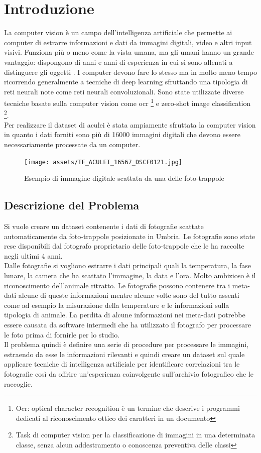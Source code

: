 \documentclass[12pt,a4paper,twoside]{article}
\begin{document}
\section{Introduzione}
La computer vision è un campo dell'intelligenza artificiale che permette ai computer di estrarre 
informazioni e dati da immagini digitali, video e altri input visivi. Funziona più o meno come la 
vista umana, ma gli umani hanno un grande vantaggio: dispongono di anni e anni di esperienza in cui 
si sono allenati a distinguere gli oggetti \cite{ibm-comp-vision}. I computer devono fare lo stesso 
ma in molto meno tempo ricorrendo generalmente a tecniche di deep learning sfruttando una tipologia di 
reti neurali note come reti neurali convoluzionali. Sono state utilizzate diverse tecniche basate sulla 
computer vision come ocr \footnote{Ocr: optical character recognition è un termine che descrive i 
programmi dedicati al riconoscimento ottico dei caratteri in un documento} e zero-shot image 
classification \footnote{Task di computer vision per la classificazione di immagini in una determinata 
classe, senza alcun addestramento o conoscenza preventiva delle classi}.\\ 
Per realizzare il dataset di aculei è stata ampiamente sfruttata la computer vision in quanto i dati 
forniti sono più di 16000 immagini digitali che devono essere necessariamente processate da un computer.

\begin{figure}[!ht]
    \centering
    \texttt{[image: assets/TF\_ACULEI\_16567\_DSCF0121.jpg]}
    \caption{Esempio di immagine digitale scattata da una delle foto-trappole}
    \label{fig:enter-label}
\end{figure}

\subsection{Descrizione del Problema}
Si vuole creare un dataset contenente i dati di fotografie scattate automaticamente da foto-trappole 
posizionate in Umbria. Le fotografie sono state rese disponibili dal fotografo proprietario delle 
foto-trappole che le ha raccolte negli ultimi 4 anni.\\ 
Dalle fotografie si vogliono estrarre i dati principali quali la temperatura, la fase lunare, la camera 
che ha scattato l'immagine, la data e l'ora. Molto ambizioso è il riconoscimento dell'animale ritratto. 
Le fotografie possono contenere tra i meta-dati alcune di queste informazioni mentre alcune volte sono 
del tutto assenti come ad esempio la misurazione della temperature e le informazioni sulla tipologia di 
animale. La perdita di alcune informazioni nei meta-dati potrebbe essere causata da software intermedi 
che ha utilizzato il fotografo per processare le foto prima di fornirle per lo studio.\\ 
Il problema quindi è definire una serie di procedure per processare le immagini, estraendo da esse le 
informazioni rilevanti e quindi creare un dataset sul quale applicare tecniche di intelligenza artificiale 
per identificare correlazioni tra le fotografie così da offrire un'esperienza coinvolgente sull'archivio 
fotografico che le raccoglie.
\end{document}
